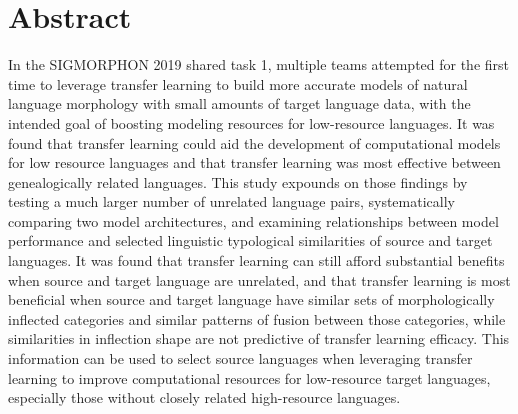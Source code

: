 %
\chapter*{Abstract}
\label{sec:abstract}
\vspace*{-10mm}

In the SIGMORPHON 2019 shared task 1, multiple teams attempted for the first time to leverage transfer learning to build more accurate models of natural language morphology with small amounts of target language data, with the intended goal of boosting modeling resources for low-resource languages. It was found that transfer learning could aid the development of computational models for low resource languages and that transfer learning was most effective between genealogically related languages. This study expounds on those findings by testing a much larger number of unrelated language pairs, systematically comparing two model architectures, and examining relationships between model performance and selected linguistic typological similarities of source and target languages. It was found that transfer learning can still afford substantial benefits when source and target language are unrelated, and that transfer learning is most beneficial when source and target language have similar sets of morphologically inflected categories and  similar patterns of fusion between those categories, while similarities in inflection shape are not predictive of transfer learning efficacy. This information can be used to select source languages when leveraging transfer learning to improve computational resources for low-resource target languages, especially those without closely related high-resource languages.